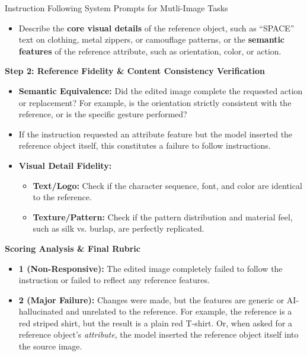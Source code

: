 \begin{promptbox}[label={System Prompts: IF_Multi-Image}]{Instruction Following System Prompts for Mutli-Image Tasks}
\begin{itemize}[leftmargin=2.2em, labelsep=0.4em, itemsep=2pt]
    \item Describe the \textbf{core visual details} of the reference object, such as ``SPACE'' text on clothing, metal zippers, or camouflage patterns, or the \textbf{semantic features} of the reference attribute, such as orientation, color, or action.
\end{itemize}

\medskip

\textbf{Step 2: Reference Fidelity \& Content Consistency Verification}

\begin{itemize}[leftmargin=2.2em, labelsep=0.4em, itemsep=2pt]
    \item \textbf{Semantic Equivalence:} Did the edited image complete the requested action or replacement? For example, is the orientation strictly consistent with the reference, or is the specific gesture performed?
    
    \item If the instruction requested an attribute feature but the model inserted the reference object itself, this constitutes a failure to follow instructions.
    
    \item \textbf{Visual Detail Fidelity:}
    
    \begin{itemize}
        \item \textbf{Text/Logo:} Check if the character sequence, font, and color are identical to the reference.
        
        \item \textbf{Texture/Pattern:} Check if the pattern distribution and material feel, such as silk vs. burlap, are perfectly replicated.
    \end{itemize}
\end{itemize}

\medskip

\textbf{Scoring Analysis \& Final Rubric}

\begin{itemize}[leftmargin=2.2em, labelsep=0.4em, itemsep=2pt]
    \item \textbf{1 (Non-Responsive):} The edited image completely failed to follow the instruction or failed to reflect any reference features.
    
    \item \textbf{2 (Major Failure):} Changes were made, but the features are generic or AI-hallucinated and unrelated to the reference. For example, the reference is a red striped shirt, but the result is a plain red T-shirt. Or, when asked for a reference object's \textit{attribute}, the model inserted the reference object itself into the source image.
    

\end{itemize}
\end{promptbox}
